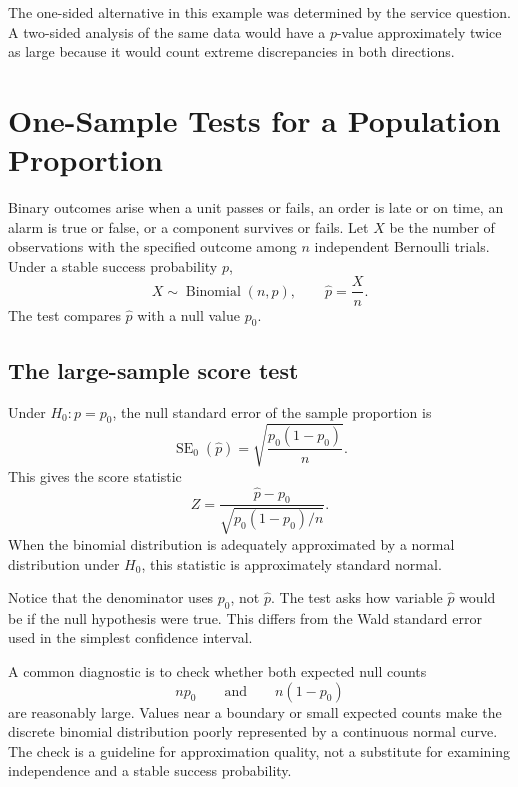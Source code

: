 The one-sided alternative in this example was determined by the service question. A two-sided analysis of the same data would have a $p$-value approximately twice as large because it would count extreme discrepancies in both directions.

\section{One-Sample Tests for a Population Proportion}
\label{sec:one-sample-proportion-tests}

Binary outcomes arise when a unit passes or fails, an order is late or on time, an alarm is true or false, or a component survives or fails. Let $X$ be the number of observations with the specified outcome among $n$ independent Bernoulli trials. Under a stable success probability $p$,
\[
X\sim\operatorname{Binomial}(n,p),
\qquad
\hat p=\frac{X}{n}.
\]
The test compares $\hat p$ with a null value $p_0$.

\subsection{The large-sample score test}

Under $H_0:p=p_0$, the null standard error of the sample proportion is
\[
\operatorname{SE}_0(\hat p)
=\sqrt{\frac{p_0(1-p_0)}{n}}.
\]
This gives the score statistic
\[
Z
=\frac{\hat p-p_0}
       {\sqrt{p_0(1-p_0)/n}}.
\]
When the binomial distribution is adequately approximated by a normal distribution under $H_0$, this statistic is approximately standard normal.

Notice that the denominator uses $p_0$, not $\hat p$. The test asks how variable $\hat p$ would be if the null hypothesis were true. This differs from the Wald standard error used in the simplest confidence interval.

A common diagnostic is to check whether both expected null counts
\[
np_0
\qquad\text{and}\qquad
n(1-p_0)
\]
are reasonably large. Values near a boundary or small expected counts make the discrete binomial distribution poorly represented by a continuous normal curve. The check is a guideline for approximation quality, not a substitute for examining independence and a stable success probability.

